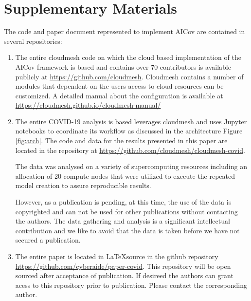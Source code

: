 \documentclass[letterpaper, inpress]{jds} %
\renewcommand{\_}{%
    \textunderscore\hspace{0pt}%
}
\begin{document}

%
%

\section*{Supplementary Materials}

The code and paper document represented to implement AICov are contained in several repositories:

\begin{enumerate}
    \item The entire cloudmesh code on which the cloud based implementation of the AICov framework is based and contains over 70 contributors is available publicly at \url{https://github.com/cloudmesh}. Cloudmesh contains a number of modules that dependent on the users access to cloud resources can be customized. A detailed manual about the configuration is available at \url{https://cloudmesh.github.io/cloudmesh-manual/}
    
    \item The entire COVID-19 analysis is based leverages cloudmesh and uses Jupyter notebooks to coordinate its workflow as discussed in the architecture Figure \ref{fig:arch}. The code and data for the results presented in this paper are located in the repository at \url{https://github.com/cloudmesh/cloudmesh-covid}.
    
    The data was analysed on a variety of supercomputing resources including an allocation of 20 compute nodes that were utilized to execute the  repeated model creation to assure reproducible results.
    
    However, as a publication is pending, at this time, the use of the data is copyrighted and can not be used for other publications without contacting the authors. The data gathering and analysis is a significant intellectual contribution and we like to avoid that the data is taken before we have not secured a publication. 
    
    \item The entire paper is located in \LaTeX source in the github repository \url{https://github.com/cyberaide/paper-covid}. This repository will be open sourced after acceptance of publication. If desireed the authors can grant acess to this repository prior to publication. Please contact the corresponding author.
    
\end{enumerate}
\end{document}
